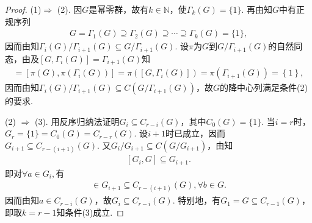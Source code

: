 \documentclass[../../main.tex]{subfiles}%
\begin{document}
\begin{proof}

(1)$\Rightarrow$ (2). 因$G$是幂零群，故有$k\in \mathbb{N}$，使$\Gamma_k(G) = \{1\}$.
再由知$G$中有正规序列
\begin{gather*}
G = \Gamma_1(G) \supseteq \Gamma_2(G) \supseteq \cdots \supseteq \Gamma_k(G) = \{1\},
\end{gather*}
因而由知$\Gamma_i(G)/\Gamma_{i+1}(G) \subseteq G/\Gamma_{i+1}(G)$. 设$\pi$为$G$到$G/\Gamma_{i+1}(G)$的自然同态，由及$[G, \Gamma_i(G)] = \Gamma_{i+1}(G)$知
\begin{align*}
[G/\Gamma _{i+1}(G),\Gamma _i(G)/\Gamma _{i+1}(G)]=[\pi (G),\pi (\Gamma _i(G))]=\pi \left( \left[ G,\Gamma _i(G) \right] \right) =\pi (\Gamma _{i+1}(G))=\left\{ 1 \right\},
\end{align*}
因而由知$\Gamma_i(G)/\Gamma_{i+1}(G) \subseteq C(G/\Gamma_{i+1}(G))$，故$G$的降中心列满足条件(2)的要求.

(2) $\Rightarrow$ (3). 用反序归纳法证明$G_i \subseteq C_{r - i}(G)$，其中$C_0(G) = \{1\}$. 当$i = r$时，$G_r = \{1\} = C_0(G) = C_{r - r}(G)$. 设$i + 1$时已成立，因而$G_{i+1} \subseteq C_{r - (i+1)}(G)$. 又$G_i/G_{i+1} \subseteq C(G/G_{i+1})$，由知
\begin{align*}
\left[ G_i,G \right] \subseteq G_{i+1}.
\end{align*}
即对$\forall a \in G_i,$有
\begin{align*}
[a,b]\in G_{i+1} \subseteq C_{r - (i+1)}(G),\forall b\in G.
\end{align*}
因而由知$a \in C_{r - i}(G)$，故$G_i \subseteq C_{r - i}(G)$. 特别地，有$G_1 = G \subseteq C_{r - 1}(G)$，即取$k = r - 1$知条件(3)成立.


\end{proof}
\end{document}
